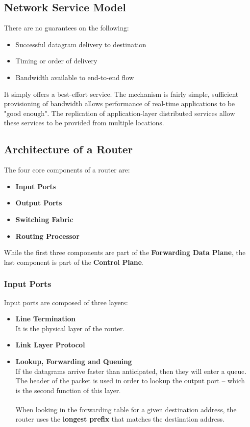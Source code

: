 \documentclass{article}
\begin{document}
\subsection{Network Service Model}
There are no guarantees on the following:

\begin{itemize}
	\item Successful datagram delivery to destination
	\item Timing or order of delivery
	\item Bandwidth available to end-to-end flow
\end{itemize}
It simply offers a best-effort service. The mechanism is fairly simple, sufficient provisioning of bandwidth allows performance of real-time applications to be "good enough". The replication of application-layer distributed services allow these services to be provided from multiple locations.

\subsection{Architecture of a Router}
The four core components of a router are:

\begin{itemize}
	\item \textbf{Input Ports}
	\item \textbf{Output Ports}
	\item \textbf{Switching Fabric}
	\item \textbf{Routing Processor}
\end{itemize}
While the first three components are part of the \textbf{Forwarding Data Plane}, the last component is part of the \textbf{Control Plane}.

\subsubsection{Input Ports}
Input ports are composed of three layers:

\begin{itemize}
	\item \textbf{Line Termination}
	\vspace{.2cm} \\
	It is the physical layer of the router.
	
	\item \textbf{Link Layer Protocol}
	\item \textbf{Lookup, Forwarding and Queuing}
	\vspace{.2cm} \\
	If the datagrams arrive faster than anticipated, then they will enter a queue. The header of the packet is used in order to lookup the output port -- which is the second function of this layer. \\ \\
	When looking in the forwarding table for a given destination address, the router uses the \textbf{longest prefix} that matches the destination address.
\end{itemize}
\end{document}
